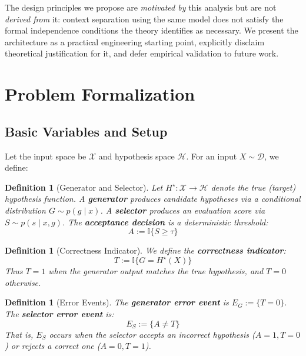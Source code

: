 \documentclass[11pt]{article}
\newtheorem{definition}[theorem]{Definition}
\begin{document}
The design principles we propose are \emph{motivated by} this analysis but are not
\emph{derived from} it: context separation using the same model does not satisfy the formal
independence conditions the theory identifies as necessary. We present the architecture as a
practical engineering starting point, explicitly disclaim theoretical justification for it,
and defer empirical validation to future work.

\section{Problem Formalization}
\label{sec:formalization}

\subsection{Basic Variables and Setup}

Let the input space be $\mathcal{X}$ and hypothesis space $\mathcal{H}$. For an input
$X \sim \mathcal{D}$, we define:

\begin{definition}[Generator and Selector]
Let $H^\star: \mathcal{X} \to \mathcal{H}$ denote the true (target) hypothesis function.
A \textbf{generator} produces candidate hypotheses via a conditional distribution
$G \sim p(g \mid x)$. A \textbf{selector} produces an evaluation score via
$S \sim p(s \mid x, g)$. The \textbf{acceptance decision} is a deterministic threshold:
\begin{equation}
A := \mathbb{I}\{S \geq \tau\}
\end{equation}
\end{definition}

\begin{definition}[Correctness Indicator]
We define the \textbf{correctness indicator}:
\begin{equation}
T := \mathbb{I}\{G = H^\star(X)\}
\end{equation}
Thus $T = 1$ when the generator output matches the true hypothesis, and $T = 0$ otherwise.
\end{definition}

\begin{definition}[Error Events]
The \textbf{generator error event} is $E_G := \{T = 0\}$. The \textbf{selector error
event} is:
\begin{equation}
E_S := \{A \neq T\}
\end{equation}
That is, $E_S$ occurs when the selector accepts an incorrect hypothesis ($A=1, T=0$) or
rejects a correct one ($A=0, T=1$).
\end{definition}
\end{document}
